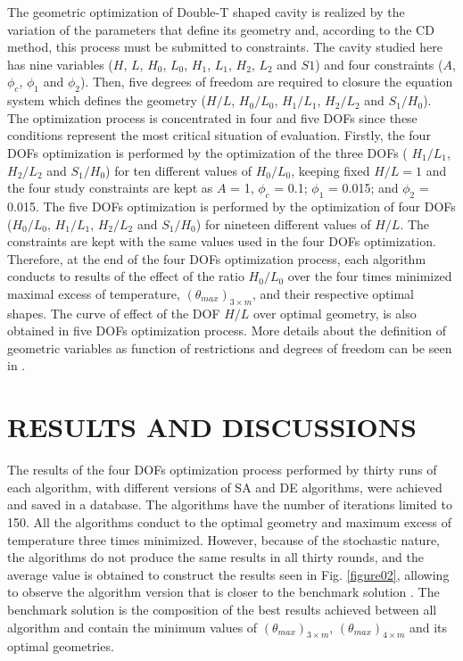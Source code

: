 \documentclass[12pt,fleqn]{article}
\begin{document}
The geometric optimization of Double-T shaped cavity is realized by the variation of the parameters that define its geometry and, according to the CD method, this process must be submitted to constraints. The cavity studied here has nine variables ($H$, $L$, $H_{0}$, $L_{0}$, $H_{1}$, $L_{1}$, $H_{2}$, $L_{2}$ and $S1$) and four constraints ($A$, $\phi_{c}$, $\phi_{1}$ and $\phi_{2}$). Then, five degrees of freedom are required to closure the equation system which defines the geometry ($H/L$, $H_{0}/L_{0}$, $H_{1}/L_{1}$, $H_{2}/L_{2}$ and $S_{1}/H_{0}$). The optimization process is concentrated in four and five DOFs since these conditions represent the most critical situation of evaluation. Firstly, the four DOFs optimization is performed by the optimization of the three DOFs ( $H_{1}/L_{1}$, $H_{2}/L_{2}$ and $S_{1}/H_{0}$) for ten different values of $H_{0}/L_{0}$,  keeping fixed  $H/L = 1$ and the four study constraints are kept as $A$ = 1, $\phi_{c}$ = 0.1; $\phi_{1}$ = 0.015; and $\phi_{2}$ = 0.015. The five DOFs optimization is performed by the optimization of four DOFs ($H_{0}/L_{0}$, $H_{1}/L_{1}$, $H_{2}/L_{2}$ and $S_{1}/H_{0}$) for nineteen different values of $H/L$.  The constraints are kept with the same values used in the four  DOFs optimization. Therefore, at the end of the four  DOFs optimization process, each algorithm conducts to results of the effect of the ratio $H_{0}/L_{0}$ over the four times minimized maximal excess of temperature, $({\theta}_{max})_{3\times m}$, and their respective optimal shapes. The curve of effect of the DOF $H/L$ over optimal geometry, is also obtained in five DOFs optimization process. More details about the definition of geometric variables as function of restrictions and degrees of freedom can be seen in \cite{Gonzales2015b}.

\section{RESULTS AND DISCUSSIONS}

The results of the four DOFs optimization process performed by thirty runs of each algorithm, with different versions of SA and DE algorithms, were achieved and saved in a database. The algorithms have the number of iterations limited to 150. All the algorithms conduct to the optimal geometry and maximum excess of temperature three times minimized. However, because of the stochastic nature, the algorithms do not produce the same results in all thirty rounds, and the average value is obtained to construct the results seen in Fig. \ref{figure02}, allowing to observe the algorithm version that is closer to the benchmark solution %
. The benchmark solution is the composition of the best results achieved between all algorithm and contain the minimum values of $({\theta}_{max})_{3\times m}$, $({\theta}_{max})_{4\times m}$ and its optimal geometries.
\end{document}
